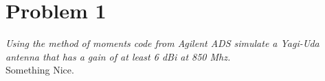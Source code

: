 \section{Problem 1}
\textit{ Using the method of moments code from Agilent ADS simulate a Yagi-Uda antenna that has a gain of at least 6 dBi at 850 Mhz.}\\

Something Nice. 




